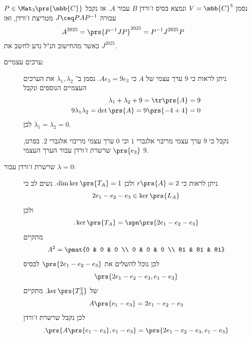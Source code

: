 \documentclass[a4paper,10pt,twoside,openany]{book}
\begin{document}
\begin{solution}
נסמן
$V = \mbb{C}^3$
ונמצא בסיס ז'ורדן
$B$
עבור
$A$.
אז נקבל
$P \in \Mat_3\prs{\mbb{C}}$
עבורה
$J \ceq P A P^{-1}$
מטריצת ז'ורדן, ואז
\begin{align*}
A^{2025} &= \prs{P^{-1}JP}^{2025}
= P^{-1}J^{2025}P
\end{align*}
כאשר מהחישוב הנ"ל נדע לחשב את
$J^{2025}$.

\begin{description}
\item[ערכים עצמיים:]
ניתן לראות כי
$9$
ערך עצמי של
$A$
כי
$A e_3 = 9 e_3$.
נסמן ב־%
$\lambda_1, \lambda_2$
את הערכים העצמיים הנוספים ונקבל
\begin{align*}
\lambda_1 + \lambda_2 + 9 = \tr\prs{A} = 9 \\
9 \lambda_1 \lambda_2 = \det\prs{A} = 9\prs{-4+4} = 0
\end{align*}
לכן
$\lambda_1 = \lambda_2 = 0$.

נקבל כי
$9$
ערך עצמי מריבוי אלגברי
$1$
וכי
$0$
ערך עצמי מריבוי אלגברי
$2$.
בפרט,
$\prs{e_3}$
שרשרת ז'ורדן עבור הערך העצמי
$9$.
\item[שרשרת ז'ורדן עבור
$\lambda = 0$:]
ניתן לראות כי
$r\prs{A} = 2$
ולכן
$\dim \ker \prs{T_A} = 1$.
נשים לב כי
\[2 e_1 - e_2 - e_3 \in \ker\prs{L_A}\]
ולכן
\[\text{.} \ker\prs{T_A} = \spn\prs{2 e_1 - e_2 - e_3}\]
מתקיים
\[A^2 = \pmat{0 & 0 & 0 \\ 0 & 0 & 0 \\ 81 & 81 & 81}\]
לכן נוכל להשלים את
$\prs{2 e_1 - e_2 - e_3}$
לבסיס
\[\prs{2 e_1 - e_2 - e_3, e_1 - e_3}\]
של
$\ker\prs{T_A^2}$.
מתקיים
\[A \prs{e_1 - e_3} = 2e_1 - e_2 - e_3\]
לכן נקבל שרשרת ז'ורדן
\[\text{.} \prs{A\prs{e_1 - e_3}, e_1 - e_3} = \prs{2e_1 - e_2 - e_3, e_1 - e_3}\]


\end{description}
\end{solution}
\end{document}
